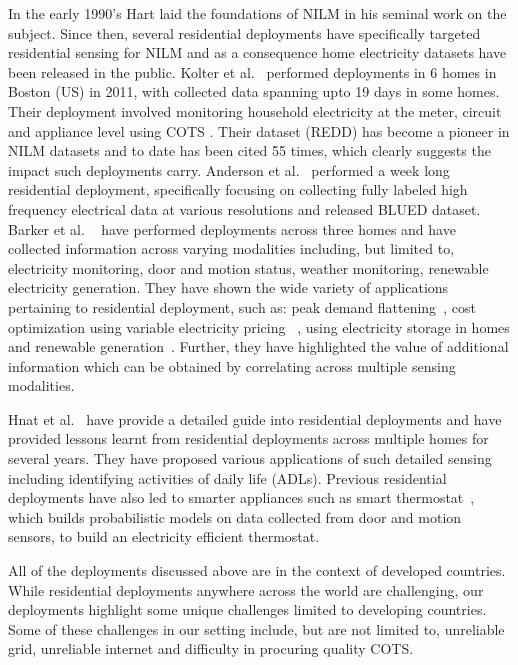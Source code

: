 \documentclass[10pt]{sensys-proc}
\begin{document}
In the early 1990’s Hart laid the foundations of NILM in his seminal work on the subject. Since then, several residential deployments have specifically targeted residential sensing for NILM and as a consequence home electricity datasets have been released in the public. Kolter et al.~\cite{redd} performed deployments in 6 homes in Boston (US) in 2011, with collected data spanning upto 19 days in some homes. Their deployment involved monitoring household electricity at the meter, circuit and appliance level using COTS . Their dataset (REDD) has become a pioneer in NILM datasets and to date has been cited 55 times, which clearly suggests the impact such deployments carry. Anderson et al.~\cite{blued_cmu} performed a week long residential deployment, specifically focusing on collecting fully labeled high frequency electrical data at various resolutions and released BLUED dataset. 
Barker et al. ~\cite{smart} have performed deployments across three homes and have collected information across varying modalities including, but limited to, electricity monitoring, door and motion status, weather monitoring, renewable electricity generation. They have shown the wide variety of applications pertaining to residential deployment, such as: peak demand flattening~\cite{smartcap}, cost optimization using variable electricity pricing~\cite{smartcharge} , using electricity storage in homes and renewable generation~\cite{cloudy}. Further, they have highlighted the value of additional information which can be obtained by correlating across multiple sensing modalities.

Hnat et al.~\cite{hitchhiker_residential} have provide a detailed guide into residential deployments and have provided lessons learnt from residential deployments across multiple homes for several years. They have proposed various applications of such detailed sensing including identifying activities of daily life (ADLs). Previous residential deployments have also led to smarter appliances such as smart thermostat~\cite{smart_thermostat}, which builds probabilistic models on data collected from door and motion sensors, to build an electricity efficient thermostat.

All of the deployments discussed above are in the context of developed countries. While residential deployments anywhere across the world are challenging, our deployments highlight some unique challenges limited to developing countries. Some of these challenges in our setting include, but are not limited to, unreliable grid, unreliable internet and difficulty in procuring quality COTS.
\end{document}
